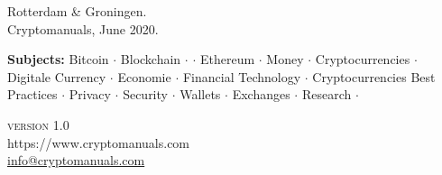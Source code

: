 \begin{titlepage}
{		

        \vspace{1cm}
        
        \small{
        Rotterdam \& Groningen.\\
        Cryptomanuals, June 2020.}
        
        \vspace{.5cm}
        
        \small{\textbf{Subjects:} Bitcoin $\cdot$ Blockchain $\cdot$  $\cdot$ Ethereum $\cdot$ Money $\cdot$ Cryptocurrencies $\cdot$ Digitale Currency $\cdot$ Economie $\cdot$ Financial Technology $\cdot$ Cryptocurrencies Best Practices $\cdot$ Privacy $\cdot$ Security $\cdot$ Wallets $\cdot$ Exchanges $\cdot$ Research $\cdot$}

   \vspace{.5cm}
	
		{\textsc{version 1.0}}\\
		\vfill
		{\noindent https://www.cryptomanuals.com}\\ %
	    \href{mailto:info@cryptomanuals.com}{info@cryptomanuals.com}
	}


\end{titlepage}